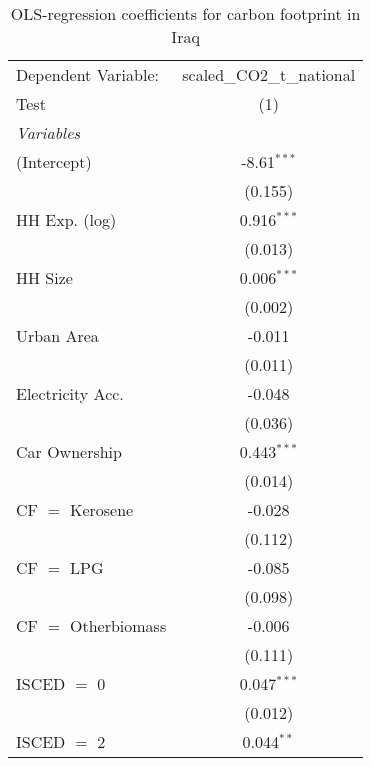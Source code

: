 
\begin{table}[htbp!]
   \centering
   \small
   \begin{adjustbox}{width = 1\textwidth, max height = 0.95\textheight, center}
      \begin{threeparttable}[b]
         \caption{\label{tab:OLS_2_IRQ} OLS-regression coefficients for carbon footprint in Iraq}
         \begin{tabular}{lc}
            \tabularnewline \midrule \midrule
            Dependent Variable: & scaled\_CO2\_t\_national\\     
            Test                & (1)\\  
            \midrule
            \emph{Variables}\\
            (Intercept)         & -8.61$^{***}$\\   
                                & (0.155)\\   
            HH Exp. (log)       & 0.916$^{***}$\\   
                                & (0.013)\\   
            HH Size             & 0.006$^{***}$\\   
                                & (0.002)\\   
            Urban Area          & -0.011\\   
                                & (0.011)\\   
            Electricity Acc.    & -0.048\\   
                                & (0.036)\\   
            Car Ownership       & 0.443$^{***}$\\   
                                & (0.014)\\   
            CF $=$ Kerosene     & -0.028\\   
                                & (0.112)\\   
            CF $=$ LPG          & -0.085\\   
                                & (0.098)\\   
            CF $=$ Otherbiomass & -0.006\\   
                                & (0.111)\\   
            ISCED $=$ 0         & 0.047$^{***}$\\   
                                & (0.012)\\   
            ISCED $=$ 2         & 0.044$^{**}$\\   

\end{tabular}
\end{threeparttable}
\end{adjustbox}
\end{table}
